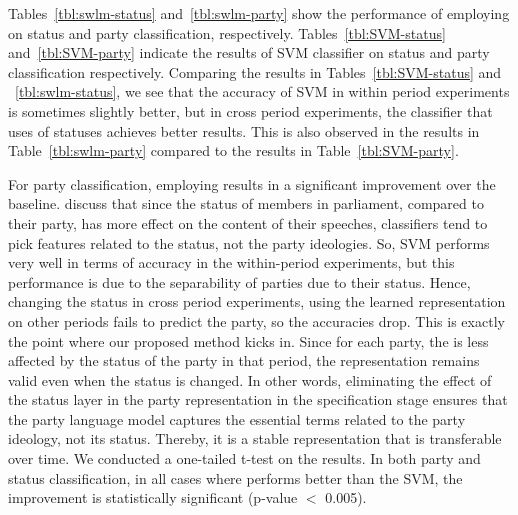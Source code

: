 


Tables~\ref{tbl:swlm-status} and~\ref{tbl:swlm-party} show the performance of employing \acswlm on status and party classification, respectively. 
Tables~\ref{tbl:SVM-status} and~\ref{tbl:SVM-party} indicate the results of SVM classifier on status and party classification respectively. Comparing the results in Tables~\ref{tbl:SVM-status} and ~\ref{tbl:swlm-status}, we see that the accuracy of SVM in within period experiments is sometimes slightly better, but in cross period experiments, the classifier that uses \acswlm of statuses achieves better results.  This is also observed in the results in Table~\ref{tbl:swlm-party} compared to the results in Table~\ref{tbl:SVM-party}. 
%

For party classification, employing \acswlm results in a significant improvement over the baseline.  \citet{Hirst:2014} discuss that since the status of members in parliament, compared to their party, has more effect on the content of their speeches, classifiers tend to pick features related to the status, not the party ideologies. So, SVM performs very well in terms of accuracy in the within-period experiments, but this performance is due to the separability of parties due to their status. Hence, changing the status in cross period experiments, using the learned representation on other periods fails to predict the party, so the accuracies drop. This is exactly the point where our proposed method kicks in. 
Since for each party, the \acswlm is less affected by the status of the party in that period, the representation remains valid even when the status is changed.  In other words, eliminating the effect of the status layer in the party representation in the specification stage ensures that the party language model captures the essential terms related to the party ideology, not its status. Thereby, it is a stable representation that is transferable over time.
%
We conducted a one-tailed t-test on the results. In both party and status classification, in all cases where \acswlm performs better than the SVM, the improvement is statistically significant ({p-value} $<$ 0.005).

